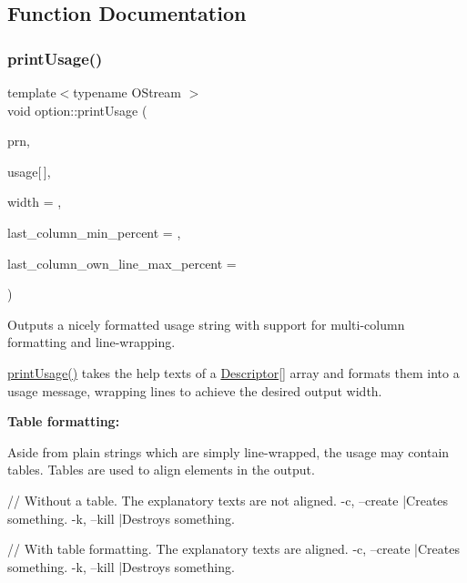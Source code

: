 \subsection{Function Documentation}
\mbox{\label{namespaceoption_afc8bb7e040a98a0b33ff1ce9da1be0d1}} 
\subsubsection{\texorpdfstring{print\+Usage()}{printUsage()}}
{\footnotesize\ttfamily template$<$typename O\+Stream $>$ \\
void option\+::print\+Usage (\begin{DoxyParamCaption}\item[{O\+Stream \&}]{prn,  }\item[{const \hyperlink{structoption_1_1Descriptor}{Descriptor}}]{usage\mbox{[}$\,$\mbox{]},  }\item[{int}]{width = {},  }\item[{int}]{last\+\_\+column\+\_\+min\+\_\+percent = {},  }\item[{int}]{last\+\_\+column\+\_\+own\+\_\+line\+\_\+max\+\_\+percent = {} }\end{DoxyParamCaption})}



Outputs a nicely formatted usage string with support for multi-\/column formatting and line-\/wrapping. 

\hyperlink{namespaceoption_afc8bb7e040a98a0b33ff1ce9da1be0d1}{print\+Usage()} takes the {\ttfamily help} texts of a \hyperlink{structoption_1_1Descriptor}{Descriptor}\mbox{[}\mbox{]} array and formats them into a usage message, wrapping lines to achieve the desired output width.

{\bfseries Table formatting\+:}

Aside from plain strings which are simply line-\/wrapped, the usage may contain tables. Tables are used to align elements in the output.


\begin{DoxyCode}
\textcolor{comment}{// Without a table. The explanatory texts are not aligned.}
-c, --create  |Creates something.
-k, --kill  |Destroys something.

\textcolor{comment}{// With table formatting. The explanatory texts are aligned.}
-c, --create  |Creates something.
-k, --kill    |Destroys something.
\end{DoxyCode}


